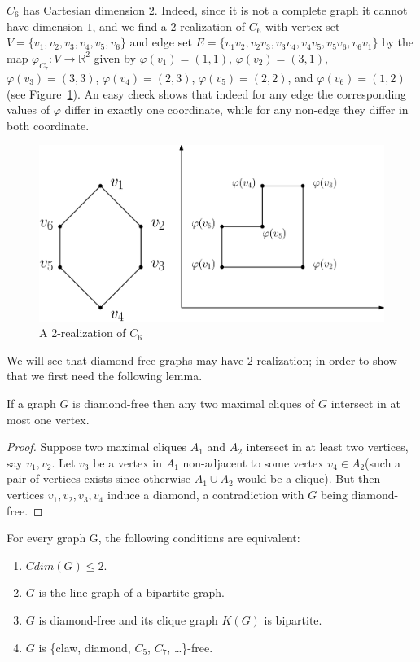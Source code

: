 \documentclass[12pt,a4paper,titlepage,openany]{report}
\begin{document}
\begin{example}
$C_6$ has Cartesian dimension $2$. Indeed, since it is not a complete graph it cannot have dimension $1$, and we find a $2$-realization of $C_6$ with vertex set $V=\{v_1,v_2,v_3,v_4,v_5,v_6\}$ and edge set $E=\{v_1v_2,v_2v_3,v_3v_4,v_4v_5,v_5v_6,v_6v_1\}$ by the map $\varphi_{C_7}:V\to \mathbb{R}^2$ given by $\varphi(v_1)=(1,1)$, $\varphi(v_2)=(3,1)$, $\varphi(v_3)=(3,3)$, $\varphi(v_4)=(2,3)$, $\varphi(v_5)=(2,2)$, and $\varphi(v_6)=(1,2)$ (see Figure~\ref{c_62real}). An easy check shows that indeed for any edge the corresponding values of $\varphi$ differ in exactly one coordinate, while for any non-edge they differ in both coordinate.
\begin{figure}[h]
\begin{center}
\includegraphics[width=1\linewidth]{figures/c_62real.png}
\end{center}
\caption{A $2$-realization of $C_6$}\label{c_62real}
\end{figure}
\end{example} 
We will see that diamond-free graphs may have $2$-realization; in order to show that we first need the following lemma.  
\begin{lemma}\label{diamondfreecliques}
If a graph $G$ is diamond-free then any two maximal cliques of $G$ intersect in at most one vertex.
\end{lemma}
\begin{proof}
Suppose two maximal cliques $A_1$ and $A_2$ intersect in at least two vertices, say $v_1, v_2$. Let $v_3$ be a vertex in $A_1$ non-adjacent to some vertex $v_4\in A_2$(such a pair of vertices exists since otherwise $A_1\cup A_2$ would be a clique). But then vertices $v_1,v_2,v_3,v_4$ induce a diamond, a contradiction with $G$ being diamond-free.
\end{proof}

\begin{theorem}
For every graph G, the following conditions are equivalent:
\begin{enumerate}
\item $Cdim(G)\leq 2$.
\item $G$ is the line graph of a bipartite graph.
\item $G$ is diamond-free and its clique graph $K(G)$ is bipartite.
\item $G$ is \{claw, diamond, $C_5$, $C_7$, \ldots\}-free.
\end{enumerate}
\end{theorem}
\end{document}
